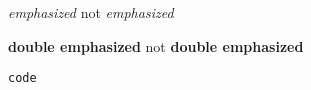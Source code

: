 \textit{emphasized} not \textit{emphasized}

\textbf{double emphasized} not \textbf{double emphasized}

\texttt{code}
